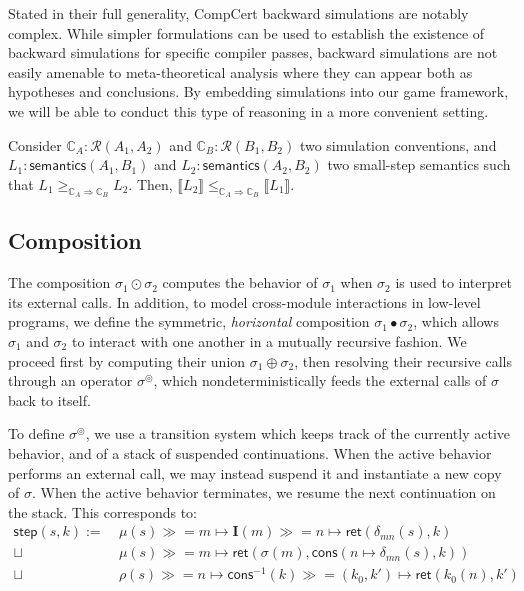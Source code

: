 \documentclass[acmsmall,timestamp,review,anonymous]{acmart}
\newcommand{\kw}[1]{\ensuremath{ \mathsf{#1} }}
\newcommand{\bind}{\gg\!\!=}
\begin{document}
Stated in their full generality,
CompCert backward simulations are notably complex.
While simpler formulations
can be used to establish
the existence of backward simulations
for specific compiler passes,
backward simulations are not easily amenable to
meta-theoretical analysis
where they can appear both as hypotheses and conclusions.
By embedding simulations into our game framework,
we will be able to conduct this type of reasoning
in a more convenient setting.

\begin{lemma}
Consider
$\mathbb{C}_A : \mathcal{R}(A_1, A_2)$ and
$\mathbb{C}_B : \mathcal{R}(B_1, B_2)$
two simulation conventions,
and
$L_1 : \kw{semantics}(A_1, B_1)$ and
$L_2 : \kw{semantics}(A_2, B_2)$
two small-step semantics
such that
$L_1 \ge_{\mathbb{C}_A \Rightarrow \mathbb{C}_B} L_2$.
Then,
$
    \llbracket L_2 \rrbracket
    \le_{\mathbb{C}_A \Rightarrow \mathbb{C}_B}
    \llbracket L_1 \rrbracket
$.
\end{lemma}


\subsection{Composition} \label{sec:modsem:comp} %

The composition $\sigma_1 \odot \sigma_2$
computes the behavior of $\sigma_1$ when $\sigma_2$ is used
to interpret its external calls.
In addition,
to model cross-module interactions in low-level programs,
we define the symmetric,
\emph{horizontal} composition
$\sigma_1 \bullet \sigma_2$,
which allows $\sigma_1$ and $\sigma_2$
to interact with one another
in a mutually recursive fashion.
We proceed first by computing their union $\sigma_1 \oplus \sigma_2$,
then resolving their recursive calls
through an operator $\sigma^\circledcirc$,
which nondeterministically feeds the external calls of $\sigma$
back to itself.

To define $\sigma^\circledcirc$,
we use a transition system which keeps track of
the currently active behavior, and
of a stack of suspended continuations.
When the active behavior performs an external call,
we may instead suspend it and instantiate a new copy of $\sigma$.
When the active behavior terminates,
we resume the next continuation on the stack.
This corresponds to:
\begin{align*}
   \kw{step}(s, k) :=
 \:  &\mu(s) \bind m \mapsto \mathbf{I}(m)
               \bind n \mapsto \kw{ret}(\delta_{mn}(s), k) \\ \sqcup
 \:  &\mu(s) \bind m \mapsto \kw{ret}(\sigma(m),
                        \kw{cons}(n \mapsto \delta_{mn}(s), k)) \\ \sqcup
 \:  &\rho(s) \bind n \mapsto
      \kw{cons}^{-1}(k) \bind (k_0, k') \mapsto
      \kw{ret}(k_0(n), k')
\end{align*}
\end{document}
